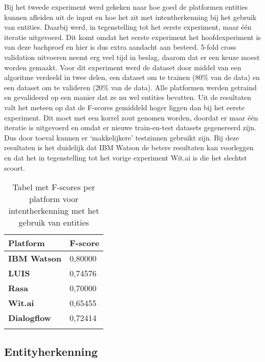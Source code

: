 Bij het tweede experiment werd gekeken naar hoe goed de platformen entities kunnen afleiden uit de input en hoe het zit met intentherkenning bij het gebruik van entities. Daarbij werd, in tegenstelling tot het eerste experiment, maar één iteratie uitgevoerd. Dit komt omdat het eerste experiment het hoofdexperiment is van deze bachproef en hier is dus extra aandacht aan besteed. 5-fold cross validation uitvoeren neemt erg veel tijd in beslag, daarom dat er een keuze moest worden gemaakt. Voor dit experiment werd de dataset door middel van een algoritme verdeeld in twee delen, een dataset om te trainen (80\% van de data) en een dataset om te valideren (20\% van de data). Alle platformen werden getraind en gevalideerd op een manier dat ze nu wel entities bevatten. Uit de resultaten valt het meteen op dat de F-scores gemiddeld hoger liggen dan bij het eerste experiment. Dit moet met een korrel zout genomen worden, doordat er maar één iteratie is uitgevoerd en omdat er nieuwe train-en-test datasets gegenereerd zijn. Dus door toeval kunnen er ‘makkelijkere’ testzinnen gebruikt zijn. Bij deze resultaten is het duidelijk dat IBM Watson de betere resultaten kan voorleggen en dat het in tegenstelling tot het vorige experiment Wit.ai is die het slechtst scoort.


\begin{center}
    \begin{longtable}{| l | l |}
        \hline
        \textbf{Platform} & \textbf{F-score} \\ \hline
        \textbf{IBM Watson} & 0,80000 \\ \hline  
        \textbf{LUIS} & 0,74576 \\ \hline  
        \textbf{Rasa} & 0,70000 \\ \hline  
        \textbf{Wit.ai} & 0,65455  \\ \hline  
        \textbf{Dialogflow} & 0,72414 \\ \hline  
        \caption{Tabel met F-scores per platform voor intentherkenning met het gebruik van entities}                                    
    \end{longtable}
    \label{tbl:results-intent-entity}
\end{center}

\subsection{Entityherkenning}

